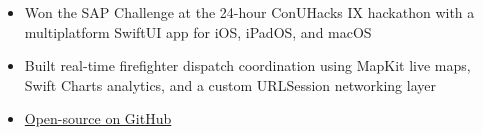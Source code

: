 
\begin{itemize}
    \item Won the SAP Challenge at the 24-hour ConUHacks IX hackathon with a multiplatform SwiftUI app for iOS, iPadOS, and macOS
    \item Built real-time firefighter dispatch coordination using MapKit live maps, Swift Charts analytics, and a custom URLSession networking layer
    \item \href{https://github.com/alireza12t/ConUHack2025-Quebec-Firefighters-iOS-App}{Open-source on GitHub}
\end{itemize}
